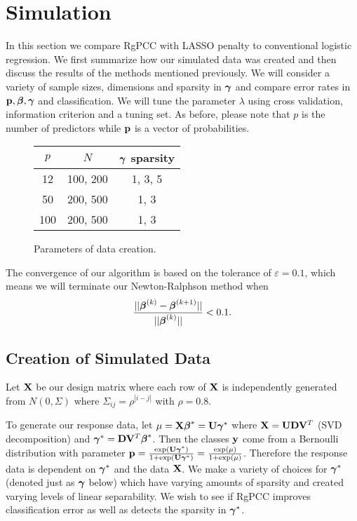 \documentclass[main.tex]{subfiles}
\begin{document}
\section{Simulation}

In this section we compare RgPCC with LASSO penalty to conventional logistic regression. We first summarize how our simulated data was created and then discuss the results of the methods mentioned previously. We will consider a variety of sample sizes, dimensions and sparsity in $\boldsymbol \gamma$ and compare error rates in $\mathbf{p}, \boldsymbol \beta, \boldsymbol \gamma$ and classification. We will tune the parameter $\lambda$ using cross validation, information criterion and a tuning set. As before, please note that $p$ is the number of predictors while $\mathbf{p}$ is a vector of probabilities.

\begin{figure}[H]
	\begin{tabular}{c|c|c}
		$p$ & $N$ & $\boldsymbol \gamma$ sparsity \\ \hline
		12 & 100, 200 & 1, 3, 5 \\
		50 & 200, 500 & 1, 3 \\
		100 & 200, 500 & 1, 3
	\end{tabular}
	\caption{Parameters of data creation.}
	\label{figure:params}
\end{figure}

The convergence of our algorithm is based on the tolerance of $\varepsilon = 0.1$, which means we will terminate our Newton-Ralphson method when $$\frac{||\boldsymbol \beta^{(k)} - \boldsymbol \beta^{(k+1)}||}{||\boldsymbol \beta^{(k)}||} < 0.1.$$

\subsection{Creation of Simulated Data}
Let $\mathbf{X}$ be our design matrix where each row of $\mathbf{X}$ is independently generated from $N(0, \Sigma)$ where $\Sigma_{ij} = \rho^{|i - j|}$ with $\rho = 0.8$.

To generate our response data, let $\mu = \mathbf{X} \boldsymbol \beta^* = \mathbf{U} \boldsymbol \gamma^*$ where $\mathbf{X} = \mathbf{U} \mathbf{D} \mathbf{V}^T$ (SVD decomposition) and $\boldsymbol \gamma^* = \mathbf{D} \mathbf{V}^T \boldsymbol \beta^*$. Then the classes $\mathbf{y}$ come from a Bernoulli distribution with parameter $\mathbf{p} = \frac{\text{exp}(\mathbf{U} \boldsymbol \gamma^*)}{1 + \text{exp}(\mathbf{U} \boldsymbol \gamma^*)} = \frac{\text{exp}(\mu)}{1 + \text{exp}(\mu)}$. Therefore the response data is dependent on $\boldsymbol \gamma^*$ and the data $\mathbf{X}$. We make a variety of choices for $\boldsymbol \gamma^*$ (denoted just as $\boldsymbol \gamma$ below) which have varying amounts of sparsity and created varying levels of linear separability. We wish to see if RgPCC improves classification error as well as detects the sparsity in $\boldsymbol \gamma^*$.
\end{document}
